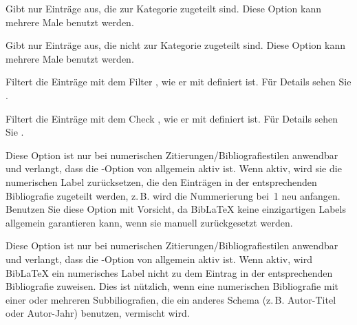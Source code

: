 \documentclass{ltxdockit}[2011/03/25]
\newcommand*{\biblatex}{BibLaTeX\xspace}
\begin{document}
\begin{optionlist*}
Gibt nur Einträge aus, die zur Kategorie  zugeteilt sind. Diese
Option kann mehrere Male benutzt werden.  


Gibt nur Einträge aus, die nicht zur Kategorie  zugeteilt sind.
Diese Option kann mehrere Male benutzt werden. 


Filtert die Einträge mit dem Filter , wie er mit 
definiert ist. Für Details sehen Sie .  


Filtert die Einträge mit dem Check , wie er mit 
definiert ist. Für Details sehen Sie . 


Diese Option ist nur bei numerischen Zitierungen\slash Bibliografiestilen
anwendbar und verlangt, dass die -Option von
 allgemein aktiv ist. Wenn aktiv, wird sie die
numerischen Label zurücksetzen, die den Einträgen in der entsprechenden
Bibliografie zugeteilt werden, z.\,B.  wird die Nummerierung bei~1 neu
anfangen. Benutzen Sie diese Option mit Vorsicht, da \biblatex keine einzigartigen
Labels allgemein garantieren kann, wenn sie manuell zurückgesetzt werden.  


Diese Option ist nur bei numerischen Zitierungen\slash Bibliografiestilen
anwendbar und verlangt, dass die -Option von
 allgemein aktiv ist. Wenn aktiv, wird \biblatex
ein numerisches Label nicht zu  dem Eintrag in der entsprechenden Bibliografie
zuweisen. Dies ist nützlich, wenn eine numerischen Bibliografie mit einer oder
mehreren Subbiliografien, die ein anderes Schema (z.\,B. Autor-Titel oder
Autor-Jahr) benutzen, vermischt wird.  

\end{optionlist*}
\end{document}
